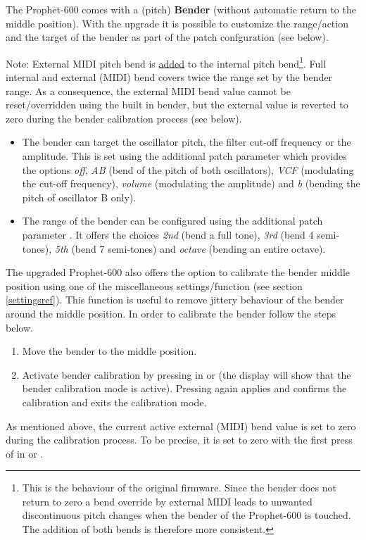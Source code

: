 The Prophet-600 comes with a (pitch) \textbf{Bender} (without automatic return to the middle position). With the upgrade it is possible to customize the range/action and the target of the bender as part of the patch confguration (see below). 

Note: External MIDI pitch bend is \underline{added} to the internal pitch bend\footnote{This is the behaviour of the original firmware. Since the bender does not return to zero a bend override by external MIDI leads to unwanted discontinuous pitch changes when the bender of the Prophet-600 is touched. The addition of both bends is therefore more consistent.}. Full internal and external (MIDI) bend covers twice the range set by the bender range. As a consequence, the external MIDI bend value cannot be reset/overridden using the built in bender, but the external value is reverted to zero during the bender calibration process (see below).

\begin{itemize}
  \item The bender can target the oscillator pitch, the filter cut-off frequency or the amplitude. This is set using the additional patch parameter \bentarget which provides the options \textit{off}, \textit{AB} (bend of the pitch of both oscillators), \textit{VCF} (modulating the cut-off frequency), \textit{volume} (modulating the amplitude) and \textit{b} (bending the pitch of oscillator B only).
  \item The range of the bender can be configured using the additional patch parameter \bendrange. It offers the choices \textit{2nd} (bend a full tone), \textit{3rd} (bend 4 semi-tones), \textit{5th} (bend 7 semi-tones) and \textit{octave} (bending an entire octave).
\end{itemize}

The upgraded Prophet-600 also offers the option to calibrate the bender middle position using one of the miscellaneous settings/function (see section \ref{settingsref}). This function is useful to remove jittery behaviour of the bender around the middle position. In order to calibrate the bender follow the steps below.

\begin{enumerate}
  \item Move the bender to the middle position.  
  \item Activate bender calibration by pressing  in \shiftmode or \shiftlock (the display will show that the bender calibration mode is active). Pressing  again applies and confirms the calibration and exits the calibration mode.
\end{enumerate}

As mentioned above, the current active external (MIDI) bend value is set to zero during the calibration process. To be precise, it is set to zero with the first press of  in \shiftmode or \shiftlock.
